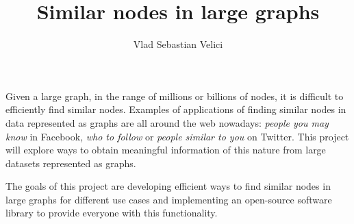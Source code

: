 \documentclass{article}
\title{Similar nodes in large graphs}
\author{Vlad Sebastian Velici}
\begin{document}
    \maketitle
    
Given a large graph, in the range of millions or billions of nodes, it is difficult to efficiently find similar nodes. Examples of applications of finding similar nodes in data represented as graphs are all around the web nowadays: \textit{people you may know} in Facebook, \textit{who to follow} or \textit{people similar to you} on Twitter. This project will explore ways to obtain meaningful information of this nature from large datasets represented as graphs.
\par
The goals of this project are developing efficient ways to find similar nodes in large graphs for different use cases and implementing an open-source software library to provide everyone with this functionality.
\end{document}
